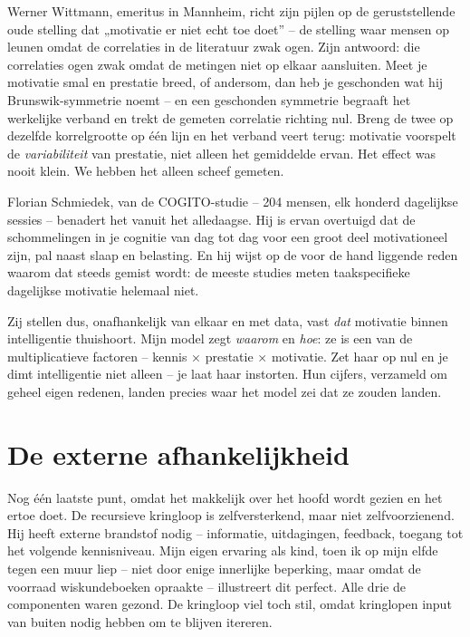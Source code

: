 \documentclass[11pt, twoside, openright]{book}
\begin{document}
Werner Wittmann, emeritus in Mannheim, richt zijn pijlen op de geruststellende oude stelling dat „motivatie er niet echt toe doet” -- de stelling waar mensen op leunen omdat de correlaties in de literatuur zwak ogen. Zijn antwoord: die correlaties ogen zwak omdat de metingen niet op elkaar aansluiten. Meet je motivatie smal en prestatie breed, of andersom, dan heb je geschonden wat hij Brunswik-symmetrie noemt -- en een geschonden symmetrie begraaft het werkelijke verband en trekt de gemeten correlatie richting nul. Breng de twee op dezelfde korrelgrootte op één lijn en het verband veert terug: motivatie voorspelt de \textit{variabiliteit} van prestatie, niet alleen het gemiddelde ervan. Het effect was nooit klein. We hebben het alleen scheef gemeten.

Florian Schmiedek, van de COGITO-studie -- 204 mensen, elk honderd dagelijkse sessies -- benadert het vanuit het alledaagse. Hij is ervan overtuigd dat de schommelingen in je cognitie van dag tot dag voor een groot deel motivationeel zijn, pal naast slaap en belasting. En hij wijst op de voor de hand liggende reden waarom dat steeds gemist wordt: de meeste studies meten taakspecifieke dagelijkse motivatie helemaal niet.

Zij stellen dus, onafhankelijk van elkaar en met data, vast \textit{dat} motivatie binnen intelligentie thuishoort. Mijn model zegt \textit{waarom} en \textit{hoe}: ze is een van de multiplicatieve factoren -- kennis × prestatie × motivatie. Zet haar op nul en je dimt intelligentie niet alleen -- je laat haar instorten. Hun cijfers, verzameld om geheel eigen redenen, landen precies waar het model zei dat ze zouden landen.

\section*{De externe afhankelijkheid}

Nog één laatste punt, omdat het makkelijk over het hoofd wordt gezien en het ertoe doet. De recursieve kringloop is zelfversterkend, maar niet zelfvoorzienend. Hij heeft externe brandstof nodig -- informatie, uitdagingen, feedback, toegang tot het volgende kennisniveau. Mijn eigen ervaring als kind, toen ik op mijn elfde tegen een muur liep -- niet door enige innerlijke beperking, maar omdat de voorraad wiskundeboeken opraakte -- illustreert dit perfect. Alle drie de componenten waren gezond. De kringloop viel toch stil, omdat kringlopen input van buiten nodig hebben om te blijven itereren.
\end{document}
